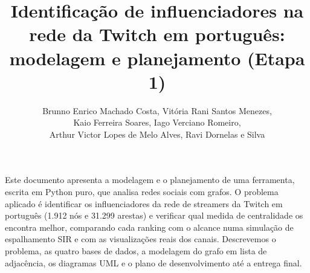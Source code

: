 \documentclass[12pt]{article}
\title{Identificação de influenciadores na rede da Twitch em português:\\
       modelagem e planejamento (Etapa 1)}
\author{Brunno Enrico Machado Costa\inst{1}, Vitória Rani Santos Menezes\inst{1},\\
  Kaio Ferreira Soares\inst{1}, Iago Verciano Romeiro\inst{1},\\
  Arthur Victor Lopes de Melo Alves\inst{1}, Ravi Dornelas e Silva\inst{1}}
\begin{document}
\maketitle

\begin{resumo}
  Este documento apresenta a modelagem e o planejamento de uma ferramenta, escrita em
  Python puro, que analisa redes sociais com grafos. O problema aplicado é identificar os
  influenciadores da rede de streamers da Twitch em português (1.912 nós e 31.299 arestas)
  e verificar qual medida de centralidade os encontra melhor, comparando cada ranking com o
  alcance numa simulação de espalhamento SIR e com as visualizações reais dos canais.
  Descrevemos o problema, as quatro bases de dados, a modelagem do grafo em lista de
  adjacência, os diagramas UML e o plano de desenvolvimento até a entrega final.
\end{resumo}




\end{document}
